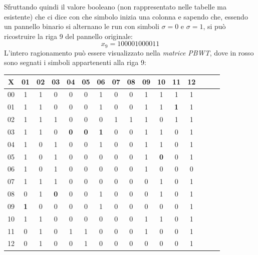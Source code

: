 \begin{esempio}
\begin{multicols}{2}
\begin{itemize}
    \end{itemize}
  \end{multicols}
  Sfruttando quindi il valore booleano (non rappresentato nelle tabelle ma
  esistente) che ci dice con che simbolo inizia una colonna e sapendo che,
  essendo un pannello binario si alternano le run con simboli $\sigma=0$ e
  $\sigma=1$, si può ricostruire la riga 9 del pannello originale:
  \[x_9=100001000011\]
  L'intero ragionamento può essere visualizzato nella \textit{matrice PBWT},
  dove in rosso sono segnati i simboli appartenenti alla riga 9:
  \begin{table}[H]
    \centering
    \footnotesize
    \begin{tabular}{c|ccccccccccccccc}
      X & 01 & 02 & 03 & 04 & 05 & 06 & 07 & 08 & 09 & 10 & 11 & 12 \\
      \hline
      00 & 1 & 1 & 0 & 0 & 0 & 1 & 0 & 0 & 1 & 1 & 1 & 1 \\
      01 & 1 & 1 & 0 & 0 & 0 & 1 & 0 & 0 & 1 & 1 & {\color{nordred}\textbf{1}}
                                                               & 1 \\
      02 & 1 & 1 & 1 & 0 & 0 & 0 & 1 & 1 & 1 & 0 & 1 & 1 \\
      03 & 1 & 1 & 0 & {\color{nordred}\textbf{0}} & {\color{nordred}\textbf{0}}
                                 & {\color{nordred}\textbf{1}} & 0 & 0 & 1 & 1
                                                          & 0 & 1 \\
      04 & 1 & 0 & 1 & 0 & 0 & 1 & 0 & 0 & 1 & 1 & 0 & 1 \\
      05 & 1 & 0 & 1 & 0 & 0 & 0 & 0 & 0 & 1 & {\color{nordred}\textbf{0}} & 0
                                                               & 1 \\
      06 & 1 & 0 & 1 & 0 & 0 & 0 & 0 & 0 & 1 & 0 & 0 & 0 \\
      07 & 1 & 1 & 1 & 0 & 0 & 0 & 0 & 0 & 0 & 1 & 0 & 1 \\
      08 & 0 & 1 & {\color{nordred}\textbf{0}} & 0 & 0 & 1 & 0 & 0 & 0 & 1 & 0
                                                               & 1 \\
      09 & {\color{nordred}\textbf{1}} & 0 & 0 & 0 & 0 & 1 & 0 & 0 & 0 & 0 & 0
                                                               & 1 \\
      10 & 1 & 1 & 0 & 0 & 0 & 0 & 0 & 0 & 1 & 1 & 0 & 1 \\
      11 & 0 & 1 & 0 & 1 & 1 & 0 & 0 & 0 & 1 & 0 & 0 & 1 \\
      12 & 0 & 1 & 0 & 0 & 1 & 0 & 0 & 0 & 0 & 0 & 0 & 1 \\

\end{tabular}
\end{table}
\end{esempio}
